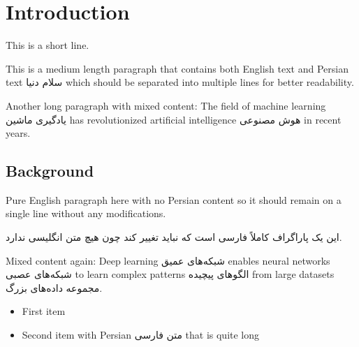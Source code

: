 \documentclass{article}
\begin{document}
\section{Introduction}

This is a short line.

This is a medium length paragraph that contains both English text and Persian text سلام دنیا which should be separated into multiple lines for better readability.

Another long paragraph with mixed content: The field of machine learning یادگیری ماشین has revolutionized artificial intelligence هوش مصنوعی in recent years.

\subsection{Background}

Pure English paragraph here with no Persian content so it should remain on a single line without any modifications.

این یک پاراگراف کاملاً فارسی است که نباید تغییر کند چون هیچ متن انگلیسی ندارد.

Mixed content again: Deep learning شبکه‌های عمیق enables neural networks شبکه‌های عصبی to learn complex patterns الگوهای پیچیده from large datasets مجموعه داده‌های بزرگ.

\begin{itemize}
\item First item
\item Second item with Persian متن فارسی that is quite long
\end{itemize}

\end{document}
